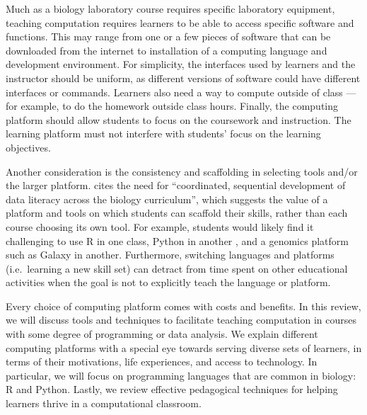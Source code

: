 Much as a biology laboratory course requires specific laboratory equipment, teaching computation requires learners to be able to access specific software and functions.
This may range from one or a few pieces of software that can be downloaded from the internet
to installation of a computing language and development environment.
For simplicity,
the interfaces used by learners and the instructor should be uniform, as different versions of software could have different interfaces or commands.
Learners also need  a way to compute outside of class --- for example, to do the homework outside class hours.
Finally, the computing platform should allow students to focus on the coursework and instruction. 
The learning platform must not interfere with students' focus on the learning objectives.

Another consideration is the consistency and scaffolding in selecting tools and/or the larger platform.
\citet{Gibson18} cites the need for ``coordinated, sequential development of data literacy across the biology curriculum'',
which suggests the value of a platform and tools on which students can scaffold their skills,
rather than each course choosing its own tool.
For example, students would likely find it challenging to use R in one class,
Python in another \citep{wu1990}, and a genomics platform such as Galaxy in another.
Furthermore, switching languages and platforms (i.e.\ learning a new skill set)
can detract from time spent on other educational activities when the goal is not to explicitly teach the language or platform.

Every choice of computing platform comes with costs and benefits. 
In this review, we will discuss tools and techniques to facilitate teaching computation in courses with some degree of programming or data analysis.
We explain different computing platforms with a special eye towards serving diverse sets of learners, 
in terms of their motivations, life experiences, and access to technology.
In particular, we will focus on programming languages that are common in biology: R and Python. 
Lastly, we review effective pedagogical techniques for helping learners thrive in a computational classroom.

